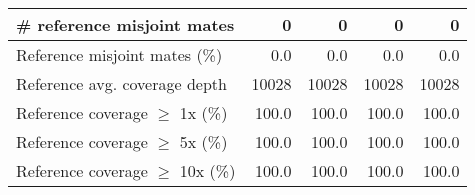 \documentclass[12pt,a4paper]{article}
\begin{document}
\begin{table}[ht]
\begin{center}
\begin{tabular}{|l*{4}{|r}|}
\# reference misjoint mates & 0 & 0 & 0 & 0 \\ \hline
Reference misjoint mates (\%) & 0.0 & 0.0 & 0.0 & 0.0 \\ \hline
Reference avg. coverage depth & 10028 & 10028 & 10028 & 10028 \\ \hline
Reference coverage $\geq$ 1x (\%) & 100.0 & 100.0 & 100.0 & 100.0 \\ \hline
Reference coverage $\geq$ 5x (\%) & 100.0 & 100.0 & 100.0 & 100.0 \\ \hline
Reference coverage $\geq$ 10x (\%) & 100.0 & 100.0 & 100.0 & 100.0 \\ \hline
\end{tabular}
\end{center}
\end{table}
\end{document}
